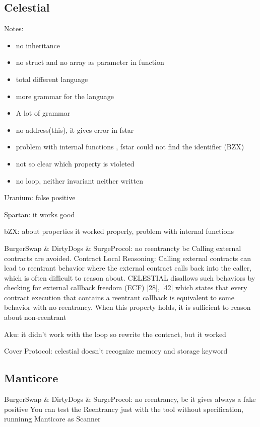\subsection{Celestial}
Notes:
\begin{itemize}
    \item no inheritance
    \item no struct and no array as parameter in function 
    \item total different language 
    \item more grammar for the language 
    \item A lot of grammar 
    \item no address(this), it gives error in fstar
    \item problem with internal functions , fstar could not find the identifier (BZX) 
    \item not so clear which property is violeted  
    \item no loop, neither invariant neither written
\end{itemize}

Uranium: false positive

Spartan: it works good 

bZX: about properties it worked properly, problem with internal functions 

BurgerSwap \& DirtyDogs \& SurgeProcol: no reentrancty bc Calling external contracts are avoided.
Contract Local Reasoning: Calling external contracts
can lead to reentrant behavior where the external contract
calls back into the caller, which is often difficult to reason
about. CELESTIAL disallows such behaviors by checking for
external callback freedom (ECF) [28], [42] which states that
every contract execution that contains a reentrant callback is
equivalent to some behavior with no reentrancy. When this
property holds, it is sufficient to reason about non-reentrant

Aku: it didn't work with the loop so rewrite the contract, but it worked 

Cover Protocol: celestial doesn't recognize memory and storage keyword

\subsection {Manticore}

BurgerSwap \& DirtyDogs \& SurgeProcol: no reentrancy, bc it gives always a fake positive
You can test the Reentrancy just with the tool without specification, runninng Manticore as Scanner 

